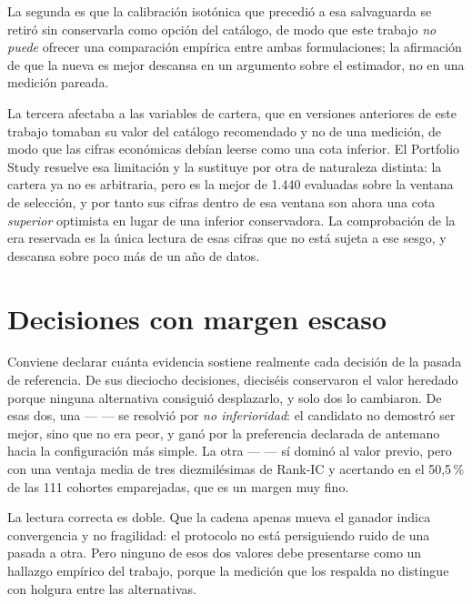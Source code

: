 La segunda es que la calibración isotónica que precedió a esa salvaguarda se retiró sin conservarla
como opción del catálogo, de modo que este trabajo \emph{no puede} ofrecer una comparación empírica
entre ambas formulaciones; la afirmación de que la nueva es mejor descansa en un argumento sobre el
estimador, no en una medición pareada.

La tercera afectaba a las variables de cartera, que en versiones anteriores de este trabajo tomaban
su valor del catálogo recomendado y no de una medición, de modo que las cifras económicas debían
leerse como una cota inferior. El Portfolio Study resuelve esa limitación y la sustituye por otra de
naturaleza distinta: la cartera ya no es arbitraria, pero es la mejor de 1.440 evaluadas sobre la
ventana de selección, y por tanto sus cifras dentro de esa ventana son ahora una cota \emph{superior}
optimista en lugar de una inferior conservadora. La comprobación de la era reservada es la única
lectura de esas cifras que no está sujeta a ese sesgo, y descansa sobre poco más de un año de datos.

\section{Decisiones con margen escaso}

Conviene declarar cuánta evidencia sostiene realmente cada decisión de la pasada de referencia.
De sus dieciocho decisiones, dieciséis conservaron el valor heredado porque ninguna alternativa
consiguió desplazarlo, y solo dos lo cambiaron. De esas dos, una
---  --- se resolvió por \emph{no inferioridad}: el candidato no
demostró ser mejor, sino que no era peor, y ganó por la preferencia declarada de antemano hacia la
configuración más simple. La otra ---  --- sí dominó al valor
previo, pero con una ventaja media de tres diezmilésimas de Rank-IC y acertando en el 50,5\,\% de
las 111 cohortes emparejadas, que es un margen muy fino.

La lectura correcta es doble. Que la cadena apenas mueva el ganador indica convergencia y no
fragilidad: el protocolo no está persiguiendo ruido de una pasada a otra. Pero ninguno de esos dos
valores debe presentarse como un hallazgo empírico del trabajo, porque la medición que los respalda
no distingue con holgura entre las alternativas.
